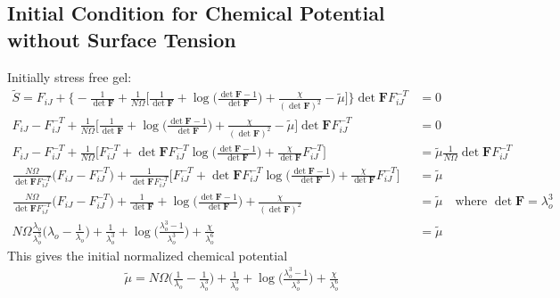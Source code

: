 \documentclass[12pt,3p]{article}
\numberwithin{equation}{section}
\begin{document}
\subsection{Initial Condition for Chemical Potential without Surface Tension}
\vspace{-1ex}
Initially stress free gel: 
\begin{align*}
\tilde{S} =  F_{iJ} + \bigg\{- \frac{1}{\det \mathbf{F}} + \frac{1}{N \Omega} \bigg[ \frac{1}{\det \mathbf{F}} + \log \bigg( \frac{\det \mathbf{F} - 1}{\det \mathbf{F}} \bigg) + \frac{\chi}{(\det \mathbf{F})^2} - \tilde{\mu} \bigg] \bigg\} \det \mathbf{F} F_{iJ}^{-T} &= 0 \\
		F_{iJ} - F_{iJ}^{-T} + \frac{1}{N \Omega} \bigg[ \frac{1}{\det \mathbf{F}} + \log \bigg( \frac{\det \mathbf{F} - 1}{\det \mathbf{F}} \bigg) + \frac{\chi}{(\det \mathbf{F})^2} - \tilde{\mu} \bigg] \det \mathbf{F} F_{iJ}^{-T} &= 0 \\
		F_{iJ} - F_{iJ}^{-T} + \frac{1}{N \Omega} \bigg[ F_{iJ}^{-T} + \det \mathbf{F} F_{iJ}^{-T} \log \bigg( \frac{\det \mathbf{F} - 1}{\det \mathbf{F}} \bigg) + \frac{\chi}{\det \mathbf{F}} F_{iJ}^{-T}\bigg] &=  \tilde{\mu} \frac{1}{N \Omega} \det \mathbf{F} F_{iJ}^{-T} \\
		 \frac{N \Omega}{\det \mathbf{F} F_{iJ}^{-T}} \bigg( F_{iJ} - F_{iJ}^{-T} \bigg) + \frac{1}{\det \mathbf{F} F_{iJ}^{-T}} \bigg[ F_{iJ}^{-T} + \det \mathbf{F} F_{iJ}^{-T} \log \bigg( \frac{\det \mathbf{F} - 1}{\det \mathbf{F}} \bigg) + \frac{\chi}{\det \mathbf{F}} F_{iJ}^{-T}\bigg] &=  \tilde{\mu} \\
		  \frac{N \Omega}{\det \mathbf{F} F_{iJ}^{-T}} \bigg( F_{iJ} - F_{iJ}^{-T} \bigg) + \frac{1}{\det \mathbf{F}} + \log \bigg( \frac{\det \mathbf{F} - 1}{\det \mathbf{F}} \bigg) + \frac{\chi}{(\det \mathbf{F})^2} &=  \tilde{\mu} \quad \text{where } \det \mathbf{F} = \lambda_o^3 \\
		  N \Omega \frac{\lambda_o}{\lambda_o^3} \bigg( \lambda_o - \frac{1}{\lambda_o} \bigg) + \frac{1}{\lambda_o^3} + \log \bigg( \frac{\lambda_o^3 - 1}{\lambda_o^3} \bigg) + \frac{\chi}{\lambda_o^6} &= \tilde{\mu} 
\end{align*}
This gives the initial normalized chemical potential
\begin{align*}
 \tilde{\mu} = N \Omega \bigg( \frac{1}{\lambda_o} - \frac{1}{\lambda_o^3} \bigg) + \frac{1}{\lambda_o^3} + \log \bigg( \frac{\lambda_o^3 - 1}{\lambda_o^3} \bigg) + \frac{\chi}{\lambda_o^6} 
\end{align*}

\end{document}

